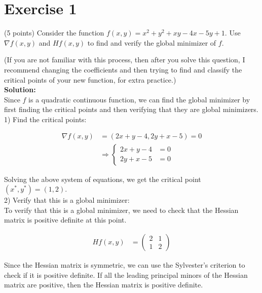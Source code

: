 \documentclass{article}
\begin{document}
\section*{Exercise 1}
(5 points) Consider the function $f(x,y) = x^2 + y^2 + xy - 4x - 5y + 1$. Use $\nabla f(x,y)$ and $Hf(x,y)$ to find and verify the global minimizer of $f$.

(If you are not familiar with this process, then after you solve this question, I recommend changing the coefficients and then trying to find and classify the critical points of your new function, for extra practice.)\\

\textbf{Solution:} \\

Since $f$ is a quadratic continuous function, we can find the global minimizer by first finding the critical points and then verifying that they are global minimizers. \\

1) Find the critical points:

\begin{align*}
    \nabla f(x,y) &= (2x + y - 4, 2y + x - 5) = 0 \\
    &\Rightarrow\left\{
    \begin{aligned}
    2x + y - 4 &= 0 \\
    2y + x - 5 &= 0
    \end{aligned}
    \right.
\end{align*}

Solving the above system of equations, we get the critical point $(x^*,y^*) = (1,2)$. \\

2) Verify that this is a global minimizer: \\

To verify that this is a global minimizer, we need to check that the Hessian matrix is positive definite at this point.

\begin{align*}
    Hf(x,y) &= \begin{pmatrix}
        2 & 1 \\
        1 & 2
    \end{pmatrix}
\end{align*}

Since the Hessian matrix is symmetric, we can use the Sylvester's criterion to check if it is positive definite. If all the leading principal minors of the Hessian matrix are positive, then the Hessian matrix is positive definite. \\
\end{document}
